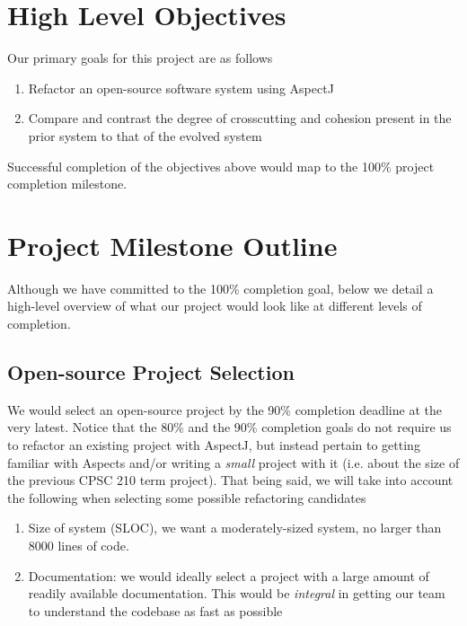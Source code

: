 \documentclass[sigconf]{acmart}
\begin{document}
\section{High Level Objectives}
Our primary goals for this project are as follows 
\begin{enumerate}
    \item Refactor an open-source software system using AspectJ
    \item Compare and contrast the degree of crosscutting and cohesion present in the prior system to that of the evolved system
\end{enumerate}

Successful completion of the objectives above would map to the 100\% project completion milestone.

\section{Project Milestone Outline}
Although we have committed to the 100\% completion goal, below we detail a high-level overview of what our project would look like at different levels of completion. 

\subsection{Open-source Project Selection}
We would select an open-source project by the 90\% completion deadline at the very latest. Notice that the 80\% and the 90\% completion goals do not require us to refactor an existing project with AspectJ, but instead pertain to getting familiar with Aspects and/or writing a \textit{small} project with it (i.e. about the size of the previous CPSC 210 term project). That being said, we will take into account the following when selecting some possible refactoring candidates
\begin{enumerate}
    \item Size of system (SLOC), we want a moderately-sized system, no larger than 8000 lines of code.
    \item Documentation: we would ideally select a project with a large amount of readily available documentation. This would be \textit{integral} in getting our team to understand the codebase as fast as possible
\end{enumerate}
\end{document}
